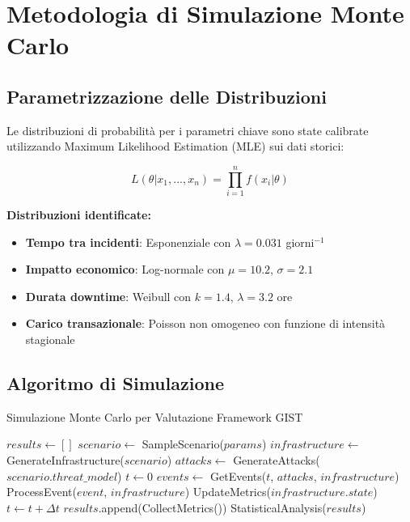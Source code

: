 \section{\texorpdfstring{Metodologia di Simulazione Monte Carlo}{A.3 - Metodologia di Simulazione Monte Carlo}}

\subsection{\texorpdfstring{Parametrizzazione delle Distribuzioni}{A.3.1 - Parametrizzazione delle Distribuzioni}}

Le distribuzioni di probabilità per i parametri chiave sono state calibrate utilizzando Maximum Likelihood Estimation (MLE) sui dati storici:

\begin{equation}
L(\theta|x_1,...,x_n) = \prod_{i=1}^{n} f(x_i|\theta)
\end{equation}

\textbf{Distribuzioni identificate:}
\begin{itemize}
    \item \textbf{Tempo tra incidenti}: Esponenziale con $\lambda = 0.031$ giorni$^{-1}$
    \item \textbf{Impatto economico}: Log-normale con $\mu = 10.2$, $\sigma = 2.1$
    \item \textbf{Durata downtime}: Weibull con $k = 1.4$, $\lambda = 3.2$ ore
    \item \textbf{Carico transazionale}: Poisson non omogeneo con funzione di intensità stagionale
\end{itemize}

\subsection{\texorpdfstring{Algoritmo di Simulazione}{A.3.2 - Algoritmo di Simulazione}}

\begin{algorithm}
\caption{Simulazione Monte Carlo per Valutazione Framework GIST}
\begin{algorithmic}[1]
    \State $results \gets []$
        \State $scenario \gets$ SampleScenario($params$)
        \State $infrastructure \gets$ GenerateInfrastructure($scenario$)
        \State $attacks \gets$ GenerateAttacks($scenario.threat\_model$)
        \State $t \gets 0$
            \State $events \gets$ GetEvents($t$, $attacks$, $infrastructure$)
                \State ProcessEvent($event$, $infrastructure$)
                \State UpdateMetrics($infrastructure.state$)
            \EndFor
            \State $t \gets t + \Delta t$
        \EndWhile
        \State $results$.append(CollectMetrics())
    \EndFor
    \State \Return StatisticalAnalysis($results$)
\EndProcedure
\end{algorithmic}
\end{algorithm}

